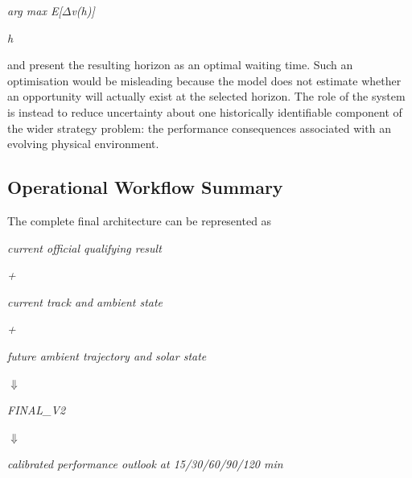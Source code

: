 \begin{center}\textit{arg max E[\ensuremath{\Delta}v(h)]}\end{center}

\begin{center}\textit{h}\end{center}

and present the resulting horizon as an optimal waiting time. Such an optimisation would be misleading because the model does not estimate whether an opportunity will actually exist at the selected horizon. The role of the system is instead to reduce uncertainty about one historically identifiable component of the wider strategy problem: the performance consequences associated with an evolving physical environment.

\subsection{Operational Workflow Summary}
The complete final architecture can be represented as

\begin{center}\textit{current official qualifying result}\end{center}

\begin{center}\textit{+}\end{center}

\begin{center}\textit{current track and ambient state}\end{center}

\begin{center}\textit{+}\end{center}

\begin{center}\textit{future ambient trajectory and solar state}\end{center}

\begin{center}\textit{\ensuremath{\Downarrow}}\end{center}

\begin{center}\textit{FINAL\_V2}\end{center}

\begin{center}\textit{\ensuremath{\Downarrow}}\end{center}

\begin{center}\textit{calibrated performance outlook at 15/30/60/90/120 min}\end{center}

